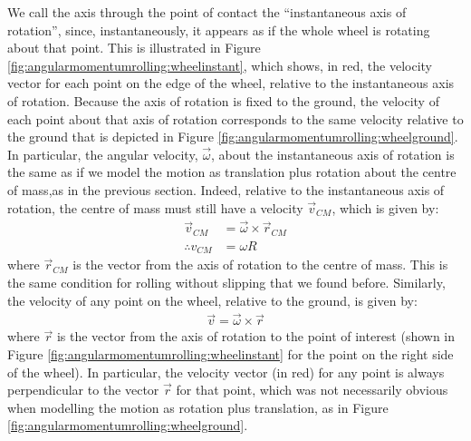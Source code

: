 We call the axis through the point of contact the ``instantaneous axis of rotation'', since, instantaneously, it appears as if the whole wheel is rotating about that point. This is illustrated in Figure \ref{fig:angularmomentumrolling:wheelinstant}, which shows, in red, the velocity vector for each point on the edge of the wheel, relative to the instantaneous axis of rotation. Because the axis of rotation is fixed to the ground, the velocity of each point about that axis of rotation corresponds to the same velocity relative to the ground that is depicted in Figure \ref{fig:angularmomentumrolling:wheelground}.
In particular, the angular velocity, $\vec \omega$, about the instantaneous axis of rotation is the same as if we model the motion as translation plus rotation about the centre of mass,as in the previous section. Indeed, relative to the instantaneous axis of rotation, the centre of mass must still have a velocity $\vec v_{CM}$, which is given by:
\begin{align*}
\vec v_{CM} &= \vec\omega \times \vec r_{CM}\\
\therefore v_{CM} &= \omega R
\end{align*}
where $\vec r_{CM}$ is the vector from the axis of rotation to the centre of mass. This is the same condition for rolling without slipping that we found before. Similarly, the velocity of any point on the wheel, relative to the ground, is given by:
\begin{align*}
\vec v = \vec\omega \times \vec r
\end{align*}
where $\vec r$ is the vector from the axis of rotation to the point of interest (shown in Figure \ref{fig:angularmomentumrolling:wheelinstant} for the point on the right side of the wheel). In particular, the velocity vector (in red) for any point is always perpendicular to the vector $\vec r$ for that point, which was not necessarily obvious when modelling the motion as rotation plus translation, as in Figure \ref{fig:angularmomentumrolling:wheelground}.


